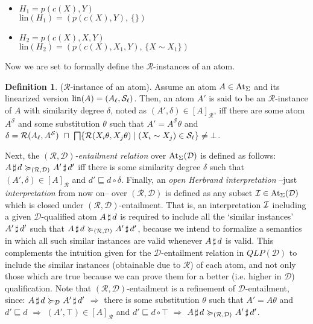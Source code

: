 \documentclass{sigplanconf}
\newcommand{\qdom}{\mathcal{D}} \newcommand{\dqdom}{D \setminus \{\bot\}} \newcommand{\bqdom}{(D \setminus \{\bot\}) \uplus \{?\}}
\newcommand{\Set}{\mathcal{S}}
\newcommand{\simrel}{\mathcal{R}}
\newcommand{\qlp}[1]{QLP({#1})} \newcommand{\slp}[2]{SLP({#1,#2})} \newcommand{\sqlp}[2]{SQLP({#1,#2})} \newcommand{\bqlp}[1]{BQLP({#1})} \newcommand{\clp}[1]{CLP({#1})}
\theoremstyle{definition}
\newtheorem{definition}{Definition}
\theoremstyle{plain}
\begin{document}
    \begin{itemize}
        \item $H_1 = p(c(X),Y)$ \\
        $\mbox{lin}(H_1) = (p(c(X),Y), \, \{\})$

        \item $H_2 = p(c(X),X,Y)$ \\
        $\mbox{lin}(H_2) = (p(c(X),X_1,Y), \, \{X \sim X_1\})$
    \end{itemize}

Now we are set to formally define the $\simrel$-instances of an atom.

\begin{definition}\label{def:r-instance-atom}
($\simrel$-instance of an atom). Assume an atom $A \in \mathrm{At}_{\Sigma}$ and its linearized version $\mbox{lin}(A) = (\linear{A}, \linear{\Set})$. Then, an atom $A'$ is said to be an $\simrel$-instance of $A$ with similarity degree $\delta$, noted as $(A',\delta) \in [A]_\simrel$, iff there are some atom $A^\Set$ and some substitution $\theta$ such that $A' = A^\Set\theta$ and $\delta = \simrel(\linear{A}, A^\Set) ~\sqcap~ \infi\{\simrel(X_i\theta, X_j\theta) \mid (X_i \sim X_j) \in \linear{\Set}\} \neq \bot$.
\end{definition}

Next, the \emph{$(\simrel, \qdom)$-entailment relation} over $\QAtz$ is defined as follows: $\at{A}{d} \DentailSim \at{A'}{d'}$ iff there is some similarity degree $\delta$ such that $(A',\delta) \in [A]_\simrel$ and $d' \sqsubseteq d \circ \delta$. Finally, an \emph{open Herbrand interpretation} --just \emph{interpretation} from now on-- over $(\simrel,\qdom)$ is defined as any subset $\I \in \QAtz$ which is closed under $(\simrel, \qdom)$-entailment. That is, an interpretation $\mathcal{I}$ including a given $\qdom$-qualified atom $A\,\sharp\,d$ is required to include all the `similar instances' $A'\,\sharp\,d'$ such that $\at{A}{d} \DentailSim \at{A'}{d'}$, because we intend to formalize a semantics in which all such similar instances are valid whenever $A\,\sharp\,d$ is valid. This complements the intuition given for the $\qdom$-entailment relation in $\qlp{\qdom}$ to include the similar instances (obtainable due to $\simrel$) of each atom, and not only those which are true because we can prove them for a better (i.e. higher in $\qdom$) qualification. Note that $(\simrel,\qdom)$-entailment is a refinement of $\qdom$-entailment, since: $\at{A}{d} \Dentail \at{A'}{d'}$ $\Longrightarrow$ there is some substitution $\theta$ such that $A' = A\theta$ and $d' \sqsubseteq d$ $\Longrightarrow$ $(A',\top) \in [A]_\simrel$ and $d' \sqsubseteq d \circ \top$ $\Longrightarrow$ $\at{A}{d} \DentailSim \at{A'}{d'}$.
\end{document}
